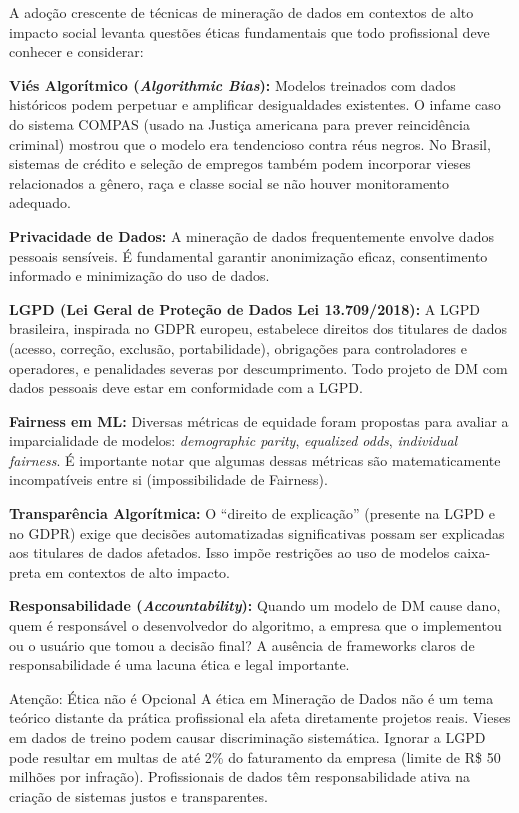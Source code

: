 \documentclass[12pt,a4paper]{article}
\begin{document}
A adoção crescente de técnicas de mineração de dados em contextos de alto impacto social levanta questões éticas fundamentais que todo profissional deve conhecer e considerar:

\textbf{Viés Algorítmico (\textit{Algorithmic Bias}):} Modelos treinados com dados históricos podem perpetuar e amplificar desigualdades existentes. O infame caso do sistema COMPAS (usado na Justiça americana para prever reincidência criminal) mostrou que o modelo era tendencioso contra réus negros. No Brasil, sistemas de crédito e seleção de empregos também podem incorporar vieses relacionados a gênero, raça e classe social se não houver monitoramento adequado.

\textbf{Privacidade de Dados:} A mineração de dados frequentemente envolve dados pessoais sensíveis. É fundamental garantir anonimização eficaz, consentimento informado e minimização do uso de dados.

\textbf{LGPD (Lei Geral de Proteção de Dados Lei 13.709/2018):} A LGPD brasileira, inspirada no GDPR europeu, estabelece direitos dos titulares de dados (acesso, correção, exclusão, portabilidade), obrigações para controladores e operadores, e penalidades severas por descumprimento. Todo projeto de DM com dados pessoais deve estar em conformidade com a LGPD.

\textbf{Fairness em ML:} Diversas métricas de equidade foram propostas para avaliar a imparcialidade de modelos: \textit{demographic parity}, \textit{equalized odds}, \textit{individual fairness}. É importante notar que algumas dessas métricas são matematicamente incompatíveis entre si (impossibilidade de Fairness).

\textbf{Transparência Algorítmica:} O ``direito de explicação'' (presente na LGPD e no GDPR) exige que decisões automatizadas significativas possam ser explicadas aos titulares de dados afetados. Isso impõe restrições ao uso de modelos caixa-preta em contextos de alto impacto.

\textbf{Responsabilidade (\textit{Accountability}):} Quando um modelo de DM cause dano, quem é responsável o desenvolvedor do algoritmo, a empresa que o implementou ou o usuário que tomou a decisão final? A ausência de frameworks claros de responsabilidade é uma lacuna ética e legal importante.

\begin{atencaobox}{Atenção: Ética não é Opcional}
A ética em Mineração de Dados não é um tema teórico distante da prática profissional ela afeta diretamente projetos reais. Vieses em dados de treino podem causar discriminação sistemática. Ignorar a LGPD pode resultar em multas de até 2\% do faturamento da empresa (limite de R\$ 50 milhões por infração). Profissionais de dados têm responsabilidade ativa na criação de sistemas justos e transparentes.
\end{atencaobox}
\end{document}
